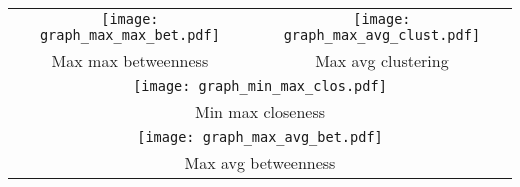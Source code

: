 \documentclass{standalone}
\begin{document}
\begin{tabular}{cc}
\texttt{[image: graph\_max\_max\_bet.pdf]} & \texttt{[image: graph\_max\_avg\_clust.pdf]}\\
  Max max betweenness & Max avg clustering\\[1em]
\multicolumn{2}{c}{\texttt{[image: graph\_min\_max\_clos.pdf]}}\\
\multicolumn{2}{c}{Min max closeness}\\[1em]
\multicolumn{2}{c}{\texttt{[image: graph\_max\_avg\_bet.pdf]}}\\
\multicolumn{2}{c}{Max avg betweenness}\\
\end{tabular}
\end{document}
